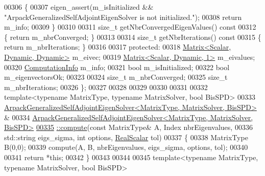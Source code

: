\begin{DoxyCode}
00306 \textcolor{keyword}{  }\{
00307     eigen\_assert(m\_isInitialized && \textcolor{stringliteral}{"ArpackGeneralizedSelfAdjointEigenSolver is not initialized."});
00308     \textcolor{keywordflow}{return} m\_info;
00309   \}
00310 
00311   \textcolor{keywordtype}{size\_t} getNbrConvergedEigenValues()\textcolor{keyword}{ const}
00312 \textcolor{keyword}{  }\{ \textcolor{keywordflow}{return} m\_nbrConverged; \}
00313 
00314   \textcolor{keywordtype}{size\_t} getNbrIterations()\textcolor{keyword}{ const}
00315 \textcolor{keyword}{  }\{ \textcolor{keywordflow}{return} m\_nbrIterations; \}
00316 
00317 \textcolor{keyword}{protected}:
00318   \hyperlink{group___core___module}{Matrix<Scalar, Dynamic, Dynamic>} m\_eivec;
00319   \hyperlink{group___core___module}{Matrix<Scalar, Dynamic, 1>} m\_eivalues;
00320   \hyperlink{group__enums_ga85fad7b87587764e5cf6b513a9e0ee5e}{ComputationInfo} m\_info;
00321   \textcolor{keywordtype}{bool} m\_isInitialized;
00322   \textcolor{keywordtype}{bool} m\_eigenvectorsOk;
00323 
00324   \textcolor{keywordtype}{size\_t} m\_nbrConverged;
00325   \textcolor{keywordtype}{size\_t} m\_nbrIterations;
00326 \};
00327 
00328 
00329 
00330 
00331 
00332 \textcolor{keyword}{template}<\textcolor{keyword}{typename} MatrixType, \textcolor{keyword}{typename} MatrixSolver, \textcolor{keywordtype}{bool} BisSPD>
00333 \hyperlink{class_eigen_1_1_arpack_generalized_self_adjoint_eigen_solver}{ArpackGeneralizedSelfAdjointEigenSolver<MatrixType, MatrixSolver, BisSPD>}
      &
00334     \hyperlink{class_eigen_1_1_arpack_generalized_self_adjoint_eigen_solver_a1a905e5e65e82e559a2cc394a9f42385}{ArpackGeneralizedSelfAdjointEigenSolver<MatrixType, MatrixSolver, BisSPD>}
\hyperlink{class_eigen_1_1_arpack_generalized_self_adjoint_eigen_solver_a781369cb32c8e4623894da79909612c4}{00335} \hyperlink{class_eigen_1_1_arpack_generalized_self_adjoint_eigen_solver_a1a905e5e65e82e559a2cc394a9f42385}{::compute}(\textcolor{keyword}{const} MatrixType& A, Index nbrEigenvalues,
00336           std::string eigs\_sigma, \textcolor{keywordtype}{int} options, \hyperlink{class_eigen_1_1_arpack_generalized_self_adjoint_eigen_solver_a2555af55e53bf9de894a49e639be2e1e}{RealScalar} tol)
00337 \{
00338     MatrixType B(0,0);
00339     compute(A, B, nbrEigenvalues, eigs\_sigma, options, tol);
00340     
00341     \textcolor{keywordflow}{return} *\textcolor{keyword}{this};
00342 \}
00343 
00344 
00345 \textcolor{keyword}{template}<\textcolor{keyword}{typename} MatrixType, \textcolor{keyword}{typename} MatrixSolver, \textcolor{keywordtype}{bool} BisSPD>

\end{DoxyCode}
